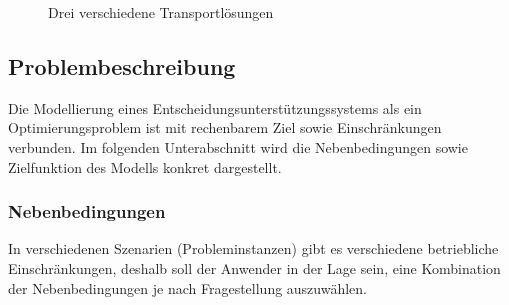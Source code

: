 \begin{figure}[ht]
\caption{Drei verschiedene Transportlösungen}
\end{figure}

\subsection{Problembeschreibung}
\label{sec:discription}
Die Modellierung eines Entscheidungsunterstützungssystems als ein Optimierungsproblem ist mit rechenbarem Ziel sowie Einschränkungen verbunden. Im folgenden Unterabschnitt wird die Nebenbedingungen sowie Zielfunktion des Modells konkret dargestellt.

\subsubsection{Nebenbedingungen}
In verschiedenen Szenarien (Probleminstanzen) gibt es verschiedene betriebliche Einschränkungen, deshalb soll der Anwender in der Lage sein, eine Kombination der Nebenbedingungen je nach Fragestellung auszuwählen.

